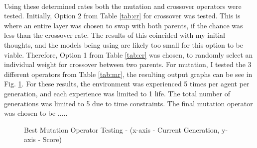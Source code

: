 \paragraph{}


Using these determined rates both the mutation and crossover operators were tested. Initially, Option 2 from Table \ref{tab:cr} for crossover was tested. This is where an entire layer was chosen to swap with both parents, if the chance was less than the crossover rate. The results of this coincided with my initial thoughts, and the models being using are likely too small for this option to be viable. Therefore, Option 1 from Table \ref{tab:cr} was chosen, to randomly select an individual weight for crossover between two parents. For mutation, I tested the 3 different operators from Table \ref{tab:mr}, the resulting output graphs can be see in Fig. \ref{fig:mot}. For these results, the environment was experienced 5 times per agent per generation, and each experience was limited to 1 life. The total number of generations was limited to 5 due to time constraints. The final mutation operator was chosen to be .....

\begin{figure}
  \centering
  \hfill
  \hfill
  \hfill
  \caption{Best Mutation Operator Testing - (x-axis - Current Generation, y-axis - Score)}
  \label{fig:mot}
\end{figure}


